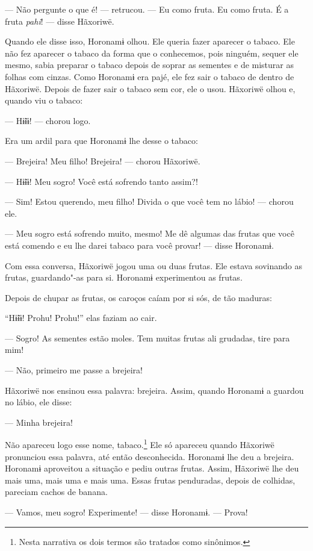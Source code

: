 --- Não pergunte o que é! --- retrucou. --- Eu como fruta. Eu como
fruta. É a fruta \emph{pahi}! --- disse Hãxoriwë. 

Quando ele disse isso, Horonamɨ olhou. Ele queria fazer aparecer o
tabaco. Ele não fez aparecer o tabaco da forma que o conhecemos, pois
ninguém, sequer ele mesmo, sabia preparar o tabaco depois de soprar as
sementes e de misturar as folhas com cinzas. Como Horonamɨ era pajé, ele
fez sair o tabaco de dentro de Hãxoriwë. Depois de fazer sair o tabaco
sem cor, ele o usou. Hãxoriwë olhou e, quando viu o tabaco: 

--- Hɨ̃ɨɨ! --- chorou logo. 

Era um ardil para que Horonamɨ lhe desse o tabaco: 

--- Brejeira! Meu filho! Brejeira! --- chorou Hãxoriwë. 

--- Hɨ̃ɨɨ! Meu sogro! Você está sofrendo tanto assim?! 

--- Sim! Estou querendo, meu filho! Divida o que você tem no
lábio! --- chorou ele.

--- Meu sogro está sofrendo muito, mesmo! Me dê algumas das frutas que
você está comendo e eu lhe darei tabaco para você provar! --- disse
Horonamɨ. 

Com essa conversa, Hãxoriwë jogou uma ou duas frutas. Ele estava
sovinando as frutas, guardando"-as para si. Horonamɨ experimentou as
frutas. 

Depois de chupar as frutas, os caroços caíam por si sós, de tão maduras:

``Hɨ̃ɨɨ! Prohu! Prohu!'' elas faziam ao cair. 

--- Sogro! As sementes estão moles. Tem muitas frutas ali grudadas, tire
para mim! 

--- Não, primeiro me passe a brejeira! 

Hãxoriwë nos ensinou essa palavra: brejeira. Assim, quando Horonamɨ a
guardou no lábio, ele disse: 

--- Minha brejeira! 

Não apareceu logo esse nome, tabaco.\footnote{   Nesta narrativa os dois termos são tratados como sinônimos.}  Ele só apareceu
quando Hãxoriwë pronunciou essa palavra, até então desconhecida.
Horonamɨ lhe deu a brejeira. Horonamɨ aproveitou a situação e pediu
outras frutas. Assim, Hãxoriwë lhe deu mais uma, mais uma e mais uma.
Essas frutas penduradas, depois de colhidas, pareciam cachos de banana. 

--- Vamos, meu sogro! Experimente! --- disse Horonamɨ. --- Prova!

